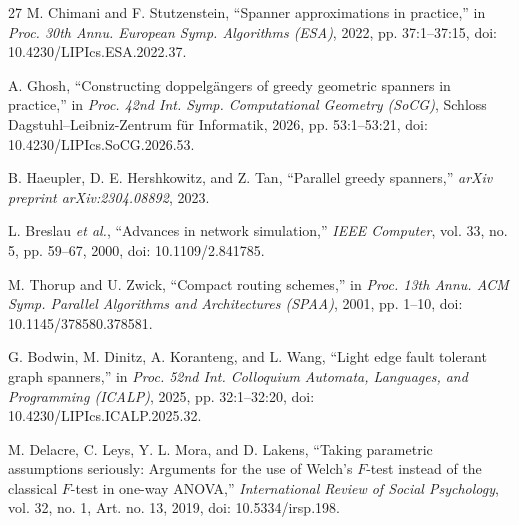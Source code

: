 \documentclass[conference]{IEEEtran}
\begin{document}
\begin{thebibliography}{27}
M. Chimani and F. Stutzenstein,
``Spanner approximations in practice,''
in \textit{Proc. 30th Annu. European Symp. Algorithms (ESA)},
2022, pp. 37:1--37:15,
doi: 10.4230/LIPIcs.ESA.2022.37.

A. Ghosh,
``Constructing doppelg\"{a}ngers of greedy geometric spanners in practice,''
in \textit{Proc. 42nd Int. Symp. Computational Geometry (SoCG)},
Schloss Dagstuhl--Leibniz-Zentrum f\"{u}r Informatik, 2026, pp. 53:1--53:21,
doi: 10.4230/LIPIcs.SoCG.2026.53.

B. Haeupler, D. E. Hershkowitz, and Z. Tan,
``Parallel greedy spanners,''
\textit{arXiv preprint arXiv:2304.08892}, 2023.

L. Breslau \textit{et al.},
``Advances in network simulation,''
\textit{IEEE Computer},
vol. 33, no. 5, pp. 59--67, 2000,
doi: 10.1109/2.841785.

M. Thorup and U. Zwick,
``Compact routing schemes,''
in \textit{Proc. 13th Annu. ACM Symp. Parallel Algorithms and Architectures (SPAA)},
2001, pp. 1--10,
doi: 10.1145/378580.378581.

G. Bodwin, M. Dinitz, A. Koranteng, and L. Wang,
``Light edge fault tolerant graph spanners,''
in \textit{Proc. 52nd Int. Colloquium Automata, Languages, and Programming (ICALP)},
2025, pp. 32:1--32:20,
doi: 10.4230/LIPIcs.ICALP.2025.32.

M. Delacre, C. Leys, Y. L. Mora, and D. Lakens,
``Taking parametric assumptions seriously: Arguments for the use of Welch's $F$-test instead of the classical $F$-test in one-way ANOVA,''
\textit{International Review of Social Psychology},
vol. 32, no. 1, Art. no. 13, 2019,
doi: 10.5334/irsp.198.

\end{thebibliography}   
\end{document}
